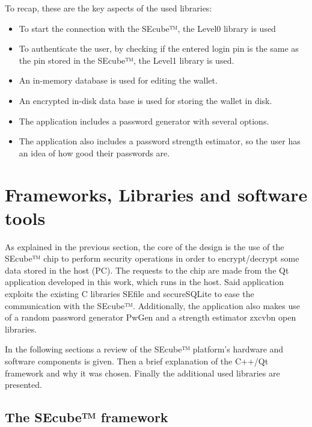 \vskip 25pt

To recap, these are the key aspects of the used libraries:

\begin{itemize}
\setlength\itemsep{0pt}

\item To start the connection with the SEcube™, the Level0 library is used
\item To authenticate the user, by checking if the entered login pin is the same as the pin stored in the SEcube™, the Level1 library is used.
\item An in-memory database is used for editing the wallet.
\item An encrypted in-disk data base is used for storing the wallet in disk.
\item The application includes a password generator with several options.
\item The application also includes a password strength estimator, so the user has an idea of how good their passwords are.

\end{itemize}

\section{Frameworks, Libraries and software tools} \label{sec:lib}

As explained in the previous section, the core of the design is the use of the SEcube™ chip to perform security operations in order to encrypt/decrypt some data stored in the host (PC). The requests to the chip are made from the Qt application developed in this work, which runs in the host. Said application exploits the existing C libraries SEfile and secureSQLite to ease the communication with the SEcube™. Additionally, the application also makes use of a random password generator PwGen and a strength estimator zxcvbn open libraries. 

In the following sections a review of the SEcube™ platform's hardware and software components is given. Then a brief explanation of the C++/Qt framework and why it was chosen. Finally the additional used libraries are presented.

\subsection{The SEcube™ framework}

